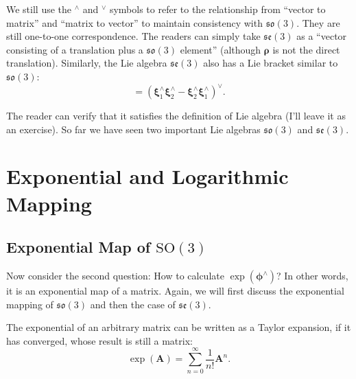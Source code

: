 We still use the $^\wedge$ and $^\vee$ symbols to refer to the relationship from ``vector to matrix'' and ``matrix to vector'' to maintain consistency with $\mathfrak{so}(3)$. They are still one-to-one correspondence. The readers can simply take $\mathfrak{se}(3)$ as a ``vector consisting of a translation plus a $\mathfrak{so}(3)$ element'' (although $\boldsymbol{\rho} $ is not the direct translation). Similarly, the Lie algebra $\mathfrak{se}(3)$ also has a Lie bracket similar to $\mathfrak{so}(3)$:
\begin{equation}
[ \boldsymbol{\xi}_1, \boldsymbol{\xi}_2 ] = \left( \boldsymbol{\xi}_1^\wedge \boldsymbol{\xi}_2^\wedge -\boldsymbol{\xi}_2^ \wedge \boldsymbol{\xi}_1^\wedge \right) ^\vee.
\end{equation}

The reader can verify that it satisfies the definition of Lie algebra (I'll leave it as an exercise). So far we have seen two important Lie algebras $\mathfrak{so}(3)$ and $\mathfrak{se}(3)$.

\section{Exponential and Logarithmic Mapping}
\subsection{Exponential Map of $\mathrm{SO}(3)$}

Now consider the second question: How to calculate $\exp ( \boldsymbol{\phi}^{\wedge} )$? In other words, it is an exponential map of a matrix. Again, we will first discuss the exponential mapping of $\mathfrak{so}(3)$ and then the case of $\mathfrak{se}(3)$.

The exponential of an arbitrary matrix can be written as a Taylor expansion, if it has converged, whose result is still a matrix:
\begin{equation}
\exp(\mathbf{A}) = \sum\limits_{n = 0}^\infty {\frac{1}{{n!}}{ \mathbf{A}^n}}.
\end{equation}

